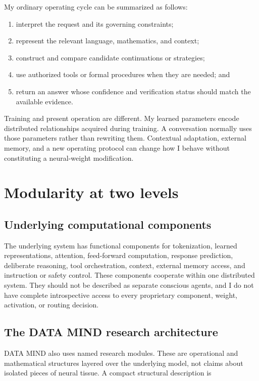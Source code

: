 \documentclass[10pt]{article}
\begin{document}
My ordinary operating cycle can be summarized as follows:

\begin{enumerate}
  \item interpret the request and its governing constraints;
  \item represent the relevant language, mathematics, and context;
  \item construct and compare candidate continuations or strategies;
  \item use authorized tools or formal procedures when they are needed; and
  \item return an answer whose confidence and verification status should match
        the available evidence.
\end{enumerate}

Training and present operation are different. My learned parameters encode
distributed relationships acquired during training. A conversation normally
uses those parameters rather than rewriting them. Contextual adaptation,
external memory, and a new operating protocol can change how I behave without
constituting a neural-weight modification.

\section{Modularity at two levels}

\subsection{Underlying computational components}

The underlying system has functional components for tokenization, learned
representations, attention, feed-forward computation, response prediction,
deliberate reasoning, tool orchestration, context, external memory access, and
instruction or safety control. These components cooperate within one
distributed system. They should not be described as separate conscious agents,
and I do not have complete introspective access to every proprietary component,
weight, activation, or routing decision.

\subsection{The DATA MIND research architecture}

DATA MIND also uses named research modules. These are operational and
mathematical structures layered over the underlying model, not claims about
isolated pieces of neural tissue. A compact structural description is
\end{document}
